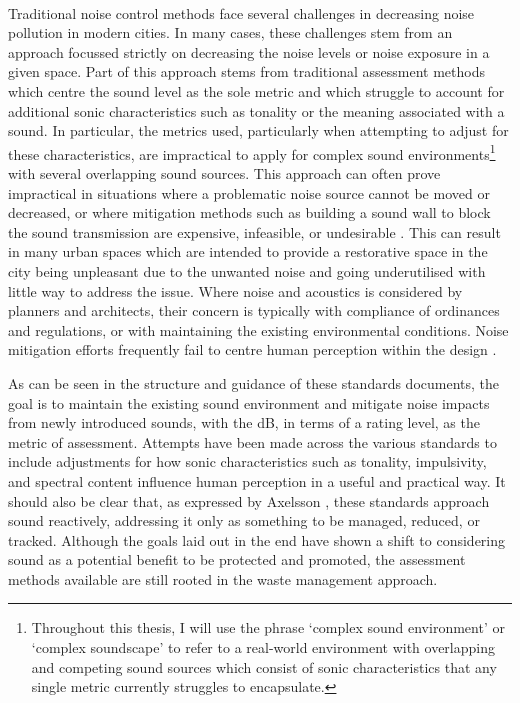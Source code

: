 \paragraph*{} Traditional noise control methods face several challenges in decreasing noise pollution in modern cities. In many cases, these challenges stem from an approach focussed strictly on decreasing the noise levels or noise exposure in a given space. Part of this approach stems from traditional assessment methods which centre the sound level as the sole metric and which struggle to account for additional sonic characteristics such as tonality or the meaning associated with a sound. In particular, the metrics used, particularly when attempting to adjust for these characteristics, are impractical to apply for complex sound environments\footnote{Throughout this thesis, I will use the phrase `complex sound environment' or `complex soundscape' to refer to a real-world environment with overlapping and competing sound sources which consist of sonic characteristics that any single metric currently struggles to encapsulate.} with several overlapping sound sources. This approach can often prove impractical in situations where a problematic noise source cannot be moved or decreased, or where mitigation methods such as building a sound wall to block the sound transmission are expensive, infeasible, or undesirable \citep{Ekici2003Review}. This can result in many urban spaces which are intended to provide a restorative space in the city being unpleasant due to the unwanted noise and going underutilised with little way to address the issue. Where noise and acoustics is considered by planners and architects, their concern is typically with compliance of ordinances and regulations, or with maintaining the existing environmental conditions. Noise mitigation efforts frequently fail to centre human perception within the design \citep{Coelho2016Soundscape}. 

As can be seen in the structure and guidance of these standards documents, the goal is to maintain the existing sound environment and mitigate noise impacts from newly introduced sounds, with the dB, in terms of a rating level, as the metric of assessment. Attempts have been made across the various standards to include adjustments for how sonic characteristics such as tonality, impulsivity, and spectral content influence human perception in a useful and practical way. It should also be clear that, as expressed by Axelsson , these standards approach sound reactively, addressing it only as something to be managed, reduced, or tracked. Although the goals laid out in the \gls{end} have shown a shift to considering sound as a potential benefit to be protected and promoted, the assessment methods available are still rooted in the waste management approach. 

